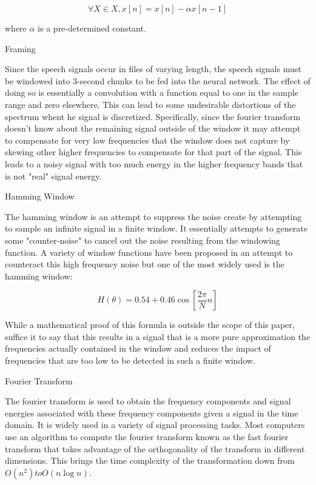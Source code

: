 \[ \forall X \in X, x[n] = x[n] - \alpha x[n-1] \]

where $\alpha$ is a pre-determined constant.



Framing

Since the speech signals occur in files of varying length, the speech signals must be windowed into 3-second chunks to be fed into the neural network. The effect of doing so is essentially a convolution with a function equal to one in the sample range and zero elsewhere. This can lead to some undesirable distortions of the spectrum whent he signal is discretized. Specifically, since the fourier transform doesn't know about the remaining signal outside of the window it may attempt to compensate for very low frequencies that the window does not capture by skewing other higher frequencies to compensate for that part of the signal. This leads to a noisy signal with too much energy in the higher frequency bands that is not "real" signal energy.

Hamming Window

The hamming window is an attempt to suppress the noise create by attempting to sample an infinite signal in a finite window. It essentially attempts to generate some "counter-noise" to cancel out the noise resulting from the windowing function. A variety of window functions have been proposed in an attempt to counteract this high frequency noise but one of the most widely used is the hamming window:

\[ H(\theta) = 0.54 + 0.46 \cos[\frac{2\pi}{N}n] \]

While a mathematical proof of this formula is outside the scope of this paper, suffice it to say that this results in a signal that is a more pure approximation the frequencies actually contained in the window and reduces the impact of frequencies that are too low to be detected in such a finite window.

Fourier Transform

The fourier transform is used to obtain the frequency components and signal energies associated with these frequency components given a signal in the time domain. It is widely used in a variety of signal processing tasks. Most computers use an algorithm to compute the fourier transform known as the fast fourier transform that takes advantage of the orthogonality of the transform in different dimensions. This brings the time complexity of the transformation down from $O(n^2) to O(n \log n)$.

